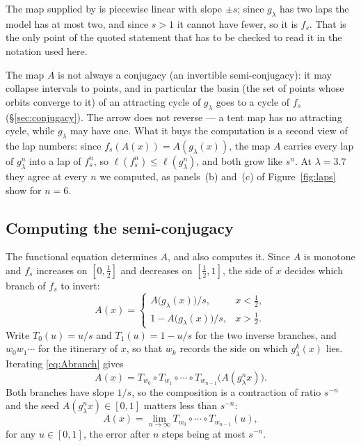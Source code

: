 \documentclass[11pt]{article}
\theoremstyle{plain}
\theoremstyle{definition}
\begin{document}
The map supplied by \cite[Theorem 7.4]{MT} is piecewise linear with slope $\pm s$; since
$g_\lambda$ has two laps the model has at most two, and since $s>1$ it cannot have fewer, so
it is $f_s$.  That is the only point of the quoted statement that has to be checked to read
it in the notation used here.

The map $A$ is not always a conjugacy (an invertible semi-conjugacy): it may collapse
intervals to points, and in particular
the basin (the set of points whose orbits converge to it) of an attracting cycle of
$g_\lambda$ goes to a cycle of $f_s$
(\S\ref{sec:conjugacy}).  The arrow does not reverse --- a tent map has no attracting cycle,
while $g_\lambda$ may have one.  What it buys
the computation is a second view of the lap numbers: since $f_s(A(x))=A(g_\lambda(x))$, the
map $A$ carries every lap of $g_\lambda^n$ into a lap of $f_s^n$, so
$\ell(f_s^n)\le\ell(g_\lambda^n)$, and both grow like $s^n$.  At $\lambda=3.7$ they agree at
every $n$ we computed, as panels~(b) and~(c) of Figure~\ref{fig:laps} show for $n=6$.

\subsection{Computing the semi-conjugacy}\label{sec:computingA}

The functional equation determines $A$, and also computes it.  Since $A$ is monotone and
$f_s$ increases on $[0,\tfrac12]$ and decreases on $[\tfrac12,1]$, the side of $x$ decides
which branch of $f_s$ to invert:
\begin{equation}\label{eq:Abranch}
  A(x)=
  \begin{cases}
    A\bigl(g_\lambda(x)\bigr)/s, & x<\tfrac12,\\[2pt]
    1-A\bigl(g_\lambda(x)\bigr)/s, & x>\tfrac12 .
  \end{cases}
\end{equation}
Write $T_0(u)=u/s$ and $T_1(u)=1-u/s$ for the two inverse branches, and $w_0w_1\cdots$ for
the itinerary of $x$, so that $w_k$ records the side on which $g_\lambda^k(x)$ lies.
Iterating \eqref{eq:Abranch} gives
\begin{equation}\label{eq:A}
  A(x)=T_{w_0}\circ T_{w_1}\circ\cdots\circ T_{w_{n-1}}\bigl(A(g_\lambda^n x)\bigr).
\end{equation}
Both branches have slope $1/s$, so the composition is a contraction of ratio $s^{-n}$ and the
seed $A(g_\lambda^n x)\in[0,1]$ matters less than $s^{-n}$:
\begin{equation}\label{eq:Alim}
  A(x)=\lim_{n\to\infty}T_{w_0}\circ\cdots\circ T_{w_{n-1}}(u),
\end{equation}
for any $u\in[0,1]$, the error after $n$ steps being at most $s^{-n}$.
\end{document}
